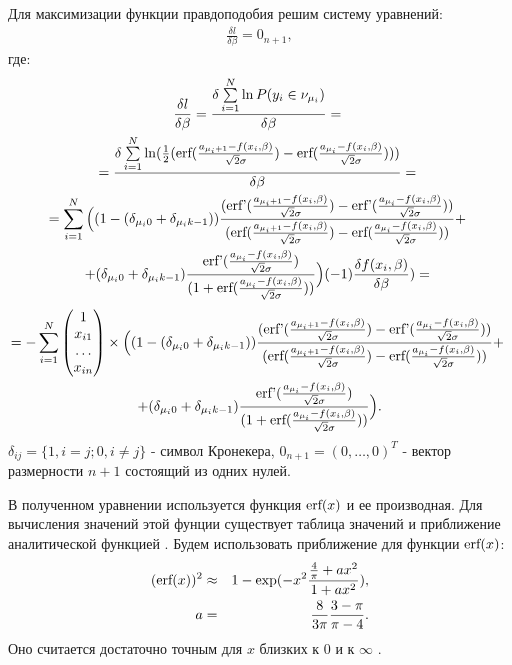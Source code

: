 Для максимизации функции правдоподобия решим систему уравнений:
\begin{eqnarray}
    \label{eq24}\frac{\delta l}{\delta \beta}=0_{n+1},
\end{eqnarray}
где:
\begin{multline}
    \label{eq27}\frac{\delta l}{\delta \beta}=\frac{\delta \sum\limits_{i=1}^{N}\ln P(y_i\in \nu_{\mu_i})}{\delta \beta}=~\\
    =\frac{\delta \sum\limits_{i=1}^{N} \ln(\frac{1}{2}(\textup{erf}(\frac{a_{\mu_i+1}-f(x_i,\beta)}{\sqrt{2}\sigma})-\textup{erf}(\frac{a_{\mu_i}-f(x_i,\beta)}{\sqrt{2}\sigma})) )         }{\delta \beta}=~\\
    =  \sum\limits_{i=1}^{N}\Big((1-(\delta_{\mu_i 0}+\delta_{\mu_i k-1}))\frac{(\textup{erf'}(\frac{a_{\mu_i+1}-f(x_i,\beta)}{\sqrt{2}\sigma})-\textup{erf'}(\frac{a_{\mu_i}-f(x_i,\beta)}{\sqrt{2}\sigma}))}{ (\textup{erf}(\frac{a_{\mu_i+1}-f(x_i,\beta)}{\sqrt{2}\sigma})-\textup{erf}(\frac{a_{\mu_i}-f(x_i,\beta)}{\sqrt{2}\sigma}))}+~\\
    +(\delta_{\mu_i 0}+\delta_{\mu_i k-1})\frac{\textup{erf'}(\frac{a_{\mu_i}-f(x_i,\beta)}{\sqrt{2}\sigma})}{(1+\textup{erf}(\frac{a_{\mu_i}-f(x_i,\beta)}{\sqrt{2}\sigma}))}\Big)  (-1) \frac{\delta f(x_i,\beta)}{\delta \beta} )=~
\end{multline}
\begin{multline}
    \nonumber 
    =-\sum_{i=1}^{N}\begin{pmatrix}
        1\\
        x_{i1}\\
        \dots\\
        x_{in}
    \end{pmatrix}\times  \Big((1-(\delta_{\mu_i 0}+\delta_{\mu_i k-1}))\frac{(\textup{erf'}(\frac{a_{\mu_i+1}-f(x_i,\beta)}{\sqrt{2}\sigma})-\textup{erf'}(\frac{a_{\mu_i}-f(x_i,\beta)}{\sqrt{2}\sigma}))}{ (\textup{erf}(\frac{a_{\mu_i+1}-f(x_i,\beta)}{\sqrt{2}\sigma})-\textup{erf}(\frac{a_{\mu_i}-f(x_i,\beta)}{\sqrt{2}\sigma}))}+~\\
    +(\delta_{\mu_i 0}+\delta_{\mu_i k-1})\frac{\textup{erf'}(\frac{a_{\mu_i}-f(x_i,\beta)}{\sqrt{2}\sigma})}{(1+\textup{erf}(\frac{a_{\mu_i}-f(x_i,\beta)}{\sqrt{2}\sigma}))}\Big) .
\end{multline}
$\delta_{ij} = \{1, i=j; 0, i\neq j\}$ - символ Кронекера, $0_{n+1}=(0, \dots, 0)^T$ - вектор размерности $n+1$ состоящий из одних нулей.

В полученном уравнении используется функция $\textup{erf}(x)$ и ее производная. Для вычисления значений этой фунции существует таблица значений и приближение аналитической функцией \cite{Winitzki}.
Будем использовать приближение для функции $\textup{erf}(x)$:
\begin{eqnarray}
    \label{eq25}(\textup{erf} (x))^2&\approx& 1- \exp(-x^2 \frac{\frac{4}{\pi}+ax^2}{1+ax^2}),\\
    \nonumber a&=&\frac{8}{3\pi}\frac{3-\pi}{\pi -4}.
\end{eqnarray}
Оно считается достаточно точным для $x$ близких к $0$ и к $\infty$ \cite{Winitzki}. \hfill\break

